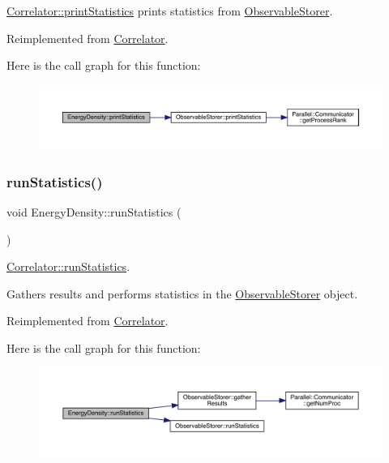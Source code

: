 \mbox{\hyperlink{class_correlator_a2168d677f547769784781d2e2aaa53cf}{Correlator\+::print\+Statistics}} prints statistics from \mbox{\hyperlink{class_observable_storer}{Observable\+Storer}}. 



Reimplemented from \mbox{\hyperlink{class_correlator_a2168d677f547769784781d2e2aaa53cf}{Correlator}}.

Here is the call graph for this function\+:\nopagebreak
\begin{figure}[H]
\begin{center}
\leavevmode
\includegraphics[width=350pt]{class_energy_density_ad108e32bc670f17f15b4ed433d8bbec7_cgraph}
\end{center}
\end{figure}
\mbox{\label{class_energy_density_a584e164453ce880a45478c9b48ce2c4b}} 
\subsubsection{\texorpdfstring{runStatistics()}{runStatistics()}}
{\footnotesize\ttfamily void Energy\+Density\+::run\+Statistics (\begin{DoxyParamCaption}{ }\end{DoxyParamCaption})\hspace{0.3cm}{\ttfamily [virtual]}}



\mbox{\hyperlink{class_correlator_a35197b1d12b62ef30b79c0138a26456e}{Correlator\+::run\+Statistics}}. 

Gathers results and performs statistics in the \mbox{\hyperlink{class_observable_storer}{Observable\+Storer}} object. 

Reimplemented from \mbox{\hyperlink{class_correlator_a35197b1d12b62ef30b79c0138a26456e}{Correlator}}.

Here is the call graph for this function\+:\nopagebreak
\begin{figure}[H]
\begin{center}
\leavevmode
\includegraphics[width=350pt]{class_energy_density_a584e164453ce880a45478c9b48ce2c4b_cgraph}
\end{center}
\end{figure}


